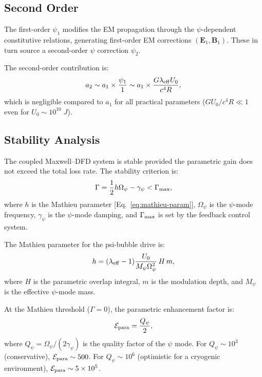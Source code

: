 \documentclass[twocolumn,prl,superscriptaddress,nofootinbib,longbibliography,floatfix]{revtex4-2}
\newcommand{\Opsi}{\Omega_\psi}
\newcommand{\gpsi}{\gamma_\psi}
\newcommand{\Mpsi}{M_\psi}
\newcommand{\lam}{\lambda}
\begin{document}
\subsection{Second Order}

The first-order $\psi_1$ modifies the EM propagation through the
$\psi$-dependent constitutive relations, generating first-order EM
corrections $(\mathbf{E}_1, \mathbf{B}_1)$.  These in turn source a
second-order $\psi$ correction $\psi_2$.

The second-order contribution is:
\begin{equation}
a_2 \sim a_1 \times \frac{\psi_1}{1}
\sim a_1 \times \frac{G\lam_{\rm eff} U_0}{c^4 R},
\label{eq:a2}
\end{equation}
which is negligible compared to $a_1$ for all practical parameters
($G U_0/c^4 R \ll 1$ even for $U_0 \sim 10^{10}\;\si{J}$).

\subsection{Stability Analysis}

The coupled Maxwell--DFD system is stable provided the parametric gain
does not exceed the total loss rate.  The stability criterion is:
\begin{equation}
\Gamma = \frac{1}{2}h\Opsi - \gpsi < \Gamma_{\rm max},
\label{eq:stability}
\end{equation}
where $h$ is the Mathieu parameter
[Eq.~\eqref{eq:mathieu-param}], $\Opsi$ is the $\psi$-mode frequency,
$\gpsi$ is the $\psi$-mode damping, and $\Gamma_{\rm max}$ is set by
the feedback control system.

The Mathieu parameter for the psi-bubble drive is:
\begin{equation}
h = (\lam_{\rm eff} - 1)\frac{U_0}{\Mpsi\Opsi^2}\,H\,m,
\label{eq:mathieu-param}
\end{equation}
where $H$ is the parametric overlap integral, $m$ is the modulation
depth, and $\Mpsi$ is the effective $\psi$-mode mass.

At the Mathieu threshold ($\Gamma = 0$), the parametric enhancement
factor is:
\begin{equation}
\mathcal{E}_{\rm para} = \frac{Q_\psi}{2},
\label{eq:E-para}
\end{equation}
where $Q_\psi = \Opsi/(2\gpsi)$ is the quality factor of the $\psi$
mode.  For $Q_\psi \sim 10^3$ (conservative), $\mathcal{E}_{\rm para}
\sim 500$.  For $Q_\psi \sim 10^6$ (optimistic for a cryogenic
environment), $\mathcal{E}_{\rm para} \sim 5 \times 10^5$.
\end{document}
